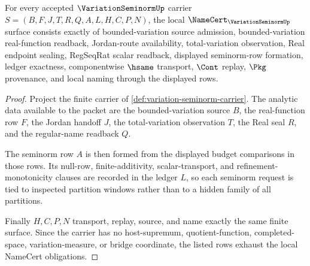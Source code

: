 
\begin{theorem}
\label{thm:variation-seminorm-namecert-obligations}
For every accepted $\VariationSeminormUp$ carrier $S=(B,F,J,T,R,Q,A,L,H,C,P,N)$, the local $\NameCert_{\VariationSeminormUp}$ surface consists exactly of bounded-variation source admission, bounded-variation real-function readback, Jordan-route availability, total-variation observation, Real endpoint sealing, RegSeqRat scalar readback, displayed seminorm-row formation, ledger exactness, componentwise $\hsame$ transport, $\Cont$ replay, $\Pkg$ provenance, and local naming through the displayed rows.
\end{theorem}
\begin{proof}
Project the finite carrier of \autoref{def:variation-seminorm-carrier}. The analytic data available to the packet are the bounded-variation source $B$, the real-function row $F$, the Jordan handoff $J$, the total-variation observation $T$, the Real seal $R$, and the regular-name readback $Q$.

The seminorm row $A$ is then formed from the displayed budget comparisons in those rows. Its null-row, finite-additivity, scalar-transport, and refinement-monotonicity clauses are recorded in the ledger $L$, so each seminorm request is tied to inspected partition windows rather than to a hidden family of all partitions.

Finally $H,C,P,N$ transport, replay, source, and name exactly the same finite surface. Since the carrier has no host-supremum, quotient-function, completed-space, variation-measure, or bridge coordinate, the listed rows exhaust the local NameCert obligations.
\end{proof}

